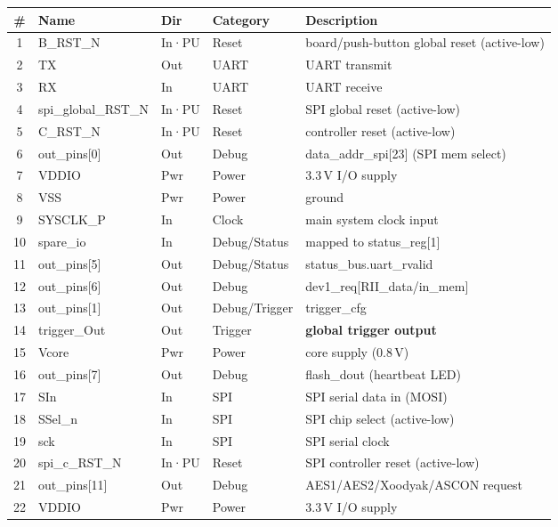 \documentclass[11pt,a4paper]{report}
\newcommand{\code}[1]{{\ttfamily\small #1}}
\begin{document}
\begin{center}
\begin{longtable}{clllp{5.3cm}}
\toprule
\# & Name & Dir & Category & Description \\ \midrule\endhead
1 & \code{B\_RST\_N} & In·PU & Reset & board/push-button global reset (active-low) \\
2 & \code{TX} & Out & UART & UART transmit \\
3 & \code{RX} & In & UART & UART receive \\
4 & \code{spi\_global\_RST\_N} & In·PU & Reset & SPI global reset (active-low) \\
5 & \code{C\_RST\_N} & In·PU & Reset & controller reset (active-low) \\
6 & \code{out\_pins[0]} & Out & Debug & \code{data\_addr\_spi[23]} (SPI mem select) \\
7 & \code{VDDIO} & Pwr & Power & 3.3\,V I/O supply \\
8 & \code{VSS} & Pwr & Power & ground \\
9 & \code{SYSCLK\_P} & In & Clock & main system clock input \\
10 & \code{spare\_io} & In & Debug/Status & mapped to \code{status\_reg[1]} \\
11 & \code{out\_pins[5]} & Out & Debug/Status & \code{status\_bus.uart\_rvalid} \\
12 & \code{out\_pins[6]} & Out & Debug & \code{dev1\_req[RII\_data/in\_mem]} \\
13 & \code{out\_pins[1]} & Out & Debug/Trigger & \code{trigger\_cfg} \\
14 & \code{trigger\_Out} & Out & Trigger & \textbf{global trigger output} \\
15 & \code{Vcore} & Pwr & Power & core supply (0.8\,V) \\
16 & \code{out\_pins[7]} & Out & Debug & \code{flash\_dout} (heartbeat LED) \\
17 & \code{SIn} & In & SPI & SPI serial data in (MOSI) \\
18 & \code{SSel\_n} & In & SPI & SPI chip select (active-low) \\
19 & \code{sck} & In & SPI & SPI serial clock \\
20 & \code{spi\_c\_RST\_N} & In·PU & Reset & SPI controller reset (active-low) \\
21 & \code{out\_pins[11]} & Out & Debug & AES1/AES2/Xoodyak/ASCON request \\
22 & \code{VDDIO} & Pwr & Power & 3.3\,V I/O supply \\

\end{longtable}
\end{center}
\end{document}
